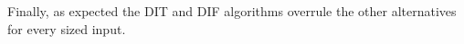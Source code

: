\documentclass[
  oneside,
  11pt, a4paper,
  footinclude=true,
  headinclude=true,
  cleardoublepage=empty
]{scrbook}
\begin{document}
Finally, as expected the DIT and DIF algorithms overrule the other alternatives for every sized input.


\cleardoublepage



\printindex

    
    \appendix
    \renewcommand\chaptername{Appendix}














\end{document}
